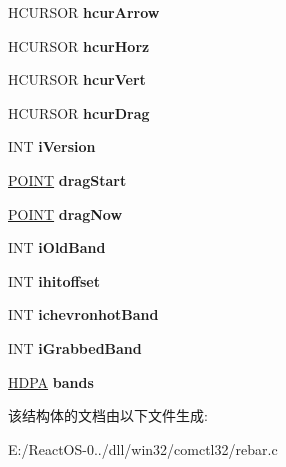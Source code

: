 \begin{DoxyCompactItemize}
\item 
\mbox{\label{struct_r_e_b_a_r___i_n_f_o_a52f4fe7c35d9e75eb6d4db750d01b3be}} 
H\+C\+U\+R\+S\+OR {\bfseries hcur\+Arrow}
\item 
\mbox{\label{struct_r_e_b_a_r___i_n_f_o_a62614c7f0690fcb8c95f1e3d6b1b70e1}} 
H\+C\+U\+R\+S\+OR {\bfseries hcur\+Horz}
\item 
\mbox{\label{struct_r_e_b_a_r___i_n_f_o_a9c658ba9491c5d5991de436613ae28a6}} 
H\+C\+U\+R\+S\+OR {\bfseries hcur\+Vert}
\item 
\mbox{\label{struct_r_e_b_a_r___i_n_f_o_a0826ca388ccd48d793b43dec5f274ac2}} 
H\+C\+U\+R\+S\+OR {\bfseries hcur\+Drag}
\item 
\mbox{\label{struct_r_e_b_a_r___i_n_f_o_ac451cfc4b8c437da123670176605617c}} 
I\+NT {\bfseries i\+Version}
\item 
\mbox{\label{struct_r_e_b_a_r___i_n_f_o_a97086124527731cbfe652d1678def71c}} 
\hyperlink{structtag_p_o_i_n_t}{P\+O\+I\+NT} {\bfseries drag\+Start}
\item 
\mbox{\label{struct_r_e_b_a_r___i_n_f_o_a8e1871a0c12d41e1565003e19a0fd65e}} 
\hyperlink{structtag_p_o_i_n_t}{P\+O\+I\+NT} {\bfseries drag\+Now}
\item 
\mbox{\label{struct_r_e_b_a_r___i_n_f_o_a7c3e855c7a478b961fbf5232c8a8f802}} 
I\+NT {\bfseries i\+Old\+Band}
\item 
\mbox{\label{struct_r_e_b_a_r___i_n_f_o_a86191e7a6922648ae80bc11b7aaca797}} 
I\+NT {\bfseries ihitoffset}
\item 
\mbox{\label{struct_r_e_b_a_r___i_n_f_o_ac828275fe53046922fa6dea1d2319acc}} 
I\+NT {\bfseries ichevronhot\+Band}
\item 
\mbox{\label{struct_r_e_b_a_r___i_n_f_o_a655f155396903da8e39c2e6203a6b525}} 
I\+NT {\bfseries i\+Grabbed\+Band}
\item 
\mbox{\label{struct_r_e_b_a_r___i_n_f_o_ab549cab1fb545558866e6a2a1d9a1879}} 
\hyperlink{struct___d_p_a}{H\+D\+PA} {\bfseries bands}
\end{DoxyCompactItemize}


该结构体的文档由以下文件生成\+:\begin{DoxyCompactItemize}
\item 
E\+:/\+React\+O\+S-\/0../dll/win32/comctl32/rebar.\+c\end{DoxyCompactItemize}
